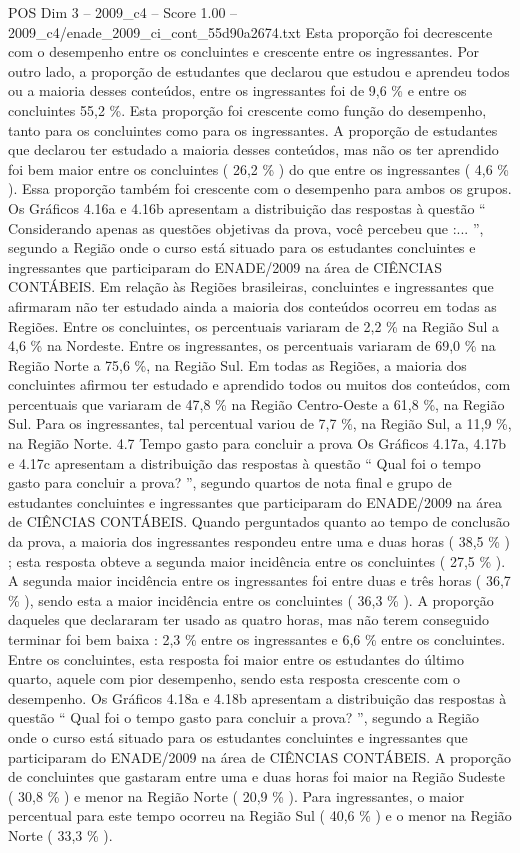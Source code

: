 \begin{textsample}{POS Dim 3 – 2009\_c4 – Score 1.00 – 2009\_c4/enade\_2009\_ci\_cont\_55d90a2674.txt}
Esta proporção foi decrescente com o desempenho entre os concluintes e crescente entre os ingressantes.
Por outro lado, a proporção de estudantes que declarou que estudou e aprendeu todos ou a maioria desses conteúdos, entre os ingressantes foi de 9,6 \% e entre os concluintes 55,2 \%.
Esta proporção foi crescente como função do desempenho, tanto para os concluintes como para os ingressantes.
A proporção de estudantes que declarou ter estudado a maioria desses conteúdos, mas não os ter aprendido foi bem maior entre os concluintes ( 26,2 \% ) do que entre os ingressantes ( 4,6 \% ).
Essa proporção também foi crescente com o desempenho para ambos os grupos.
Os Gráficos 4.16a e 4.16b apresentam a distribuição das respostas à questão “ Considerando apenas as questões objetivas da prova, você percebeu que :... ”, segundo a Região onde o curso está situado para os estudantes concluintes e ingressantes que participaram do ENADE/2009 na área de CIÊNCIAS CONTÁBEIS.
Em relação às Regiões brasileiras, concluintes e ingressantes que afirmaram não ter estudado ainda a maioria dos conteúdos ocorreu em todas as Regiões.
Entre os concluintes, os percentuais variaram de 2,2 \% na Região Sul a 4,6 \% na Nordeste.
Entre os ingressantes, os percentuais variaram de 69,0 \% na Região Norte a 75,6 \%, na Região Sul.
Em todas as Regiões, a maioria dos concluintes afirmou ter estudado e aprendido todos ou muitos dos conteúdos, com percentuais que variaram de 47,8 \% na Região Centro-Oeste a 61,8 \%, na Região Sul.
Para os ingressantes, tal percentual variou de 7,7 \%, na Região Sul, a 11,9 \%, na Região Norte. 4.7 Tempo gasto para concluir a prova Os Gráficos 4.17a, 4.17b e 4.17c apresentam a distribuição das respostas à questão “ Qual foi o tempo gasto para concluir a prova? ”, segundo quartos de nota final e grupo de estudantes concluintes e ingressantes que participaram do ENADE/2009 na área de CIÊNCIAS CONTÁBEIS.
Quando perguntados quanto ao tempo de conclusão da prova, a maioria dos ingressantes respondeu entre uma e duas horas ( 38,5 \% ) ; esta resposta obteve a segunda maior incidência entre os concluintes ( 27,5 \% ).
A segunda maior incidência entre os ingressantes foi entre duas e três horas ( 36,7 \% ), sendo esta a maior incidência entre os concluintes ( 36,3 \% ).
A proporção daqueles que declararam ter usado as quatro horas, mas não terem conseguido terminar foi bem baixa : 2,3 \% entre os ingressantes e 6,6 \% entre os concluintes.
Entre os concluintes, esta resposta foi maior entre os estudantes do último quarto, aquele com pior desempenho, sendo esta resposta crescente com o desempenho.
Os Gráficos 4.18a e 4.18b apresentam a distribuição das respostas à questão “ Qual foi o tempo gasto para concluir a prova? ”, segundo a Região onde o curso está situado para os estudantes concluintes e ingressantes que participaram do ENADE/2009 na área de CIÊNCIAS CONTÁBEIS.
A proporção de concluintes que gastaram entre uma e duas horas foi maior na Região Sudeste ( 30,8 \% ) e menor na Região Norte ( 20,9 \% ).
Para ingressantes, o maior percentual para este tempo ocorreu na Região Sul ( 40,6 \% ) e o menor na Região Norte ( 33,3 \% ).

\end{textsample}
